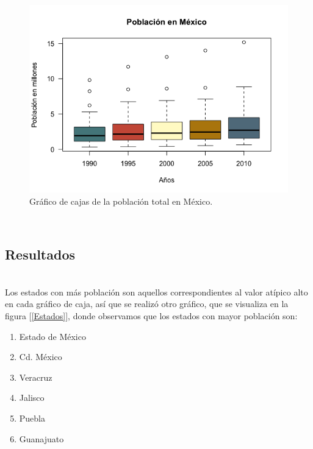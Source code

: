 \documentclass[12pt,letterpaper]{article}
\begin{document}
\begin{figure}[h!]
\centering

\includegraphics[scale=0.5]{Rplot02.PNG}
\caption{Gráfico de cajas de la población total en México.}
\label{PoblacionMexico}
\end{figure}

~\\

\subsection*{Resultados}~\\

 Los estados con más población son aquellos correspondientes al valor atípico alto en cada gráfico de caja, así que se realizó otro gráfico, que se visualiza en la figura [\ref{Estados}], donde observamos que los estados con mayor población son:
	\begin{enumerate}
	\item Estado de México
	\item Cd. México
	\item Veracruz
	\item Jalisco
	\item Puebla
	\item Guanajuato
	\end{enumerate}
\end{document}
